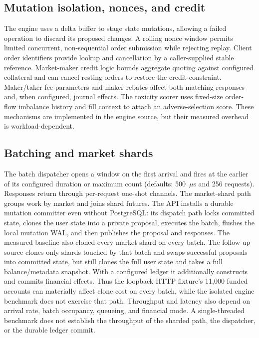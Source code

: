\documentclass[envcountsame,runningheads,notitlepage]{llncs}
\newcommand{\pathref}[1]{\texttt{\detokenize{#1}}}
\begin{document}
\subsection{Mutation isolation, nonces, and credit}
The engine uses a delta buffer to stage state mutations, allowing a failed operation to discard its proposed changes. A rolling nonce window permits limited concurrent, non-sequential order submission while rejecting replay. Client order identifiers provide lookup and cancellation by a caller-supplied stable reference. Market-maker credit logic bounds aggregate quoting against configured collateral and can cancel resting orders to restore the credit constraint. Maker/taker fee parameters and maker rebates affect both matching responses and, when configured, journal effects. The toxicity scorer uses fixed-size order-flow imbalance history and fill context to attach an adverse-selection score. These mechanisms are implemented in the engine source, but their measured overhead is workload-dependent.\cite{source}

\subsection{Batching and market shards}
The batch dispatcher opens a window on the first arrival and fires at the earlier of its configured duration or maximum count (defaults: 500~$\mu$s and 256 requests). Responses return through per-request one-shot channels. The market-shard path groups work by market and joins shard futures. The API installs a durable mutation committer even without PostgreSQL: its dispatch path locks committed state, clones the user state into a private proposal, executes the batch, flushes the local mutation WAL, and then publishes the proposal and responses. The measured baseline also cloned every market shard on every batch. The follow-up source clones only shards touched by that batch and swaps successful proposals into committed state, but still clones the full user state and takes a full balance/metadata snapshot. With a configured ledger it additionally constructs and commits financial effects. Thus the loopback HTTP fixture's 11,000 funded accounts can materially affect clone cost on every batch, while the isolated engine benchmark does not exercise that path. Throughput and latency also depend on arrival rate, batch occupancy, queueing, and financial mode. A single-threaded \pathref{MatchingEngine.process} benchmark does not establish the throughput of the sharded path, the dispatcher, or the durable ledger commit.\cite{source,ledgerboundary}
\end{document}
